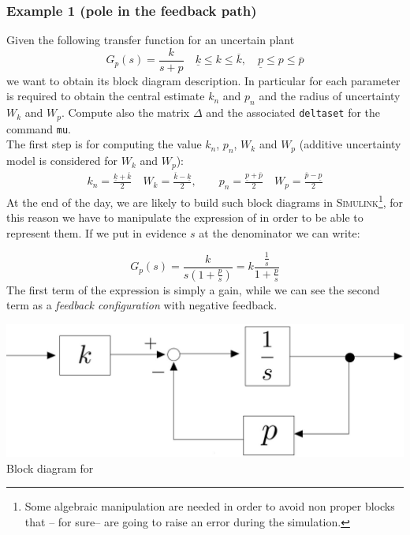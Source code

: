 \documentclass[a4paper, 12pt]{article}
\begin{document}
\subsubsection*{Example 1 (pole in the feedback path)}
Given the following transfer function for an uncertain plant 
\begin{equation}\label{eq:ex1}
    G_p(s)=\frac{k}{s+p} \quad  
    \underline{k}\le {k} \le \overline{k}, \quad
    \underline{p}\le {p} \le \overline{p}
\end{equation}
we want to obtain its block diagram description. In particular for each parameter is required to obtain the central estimate $k_n$ and $p_n$ and the radius of uncertainty $W_k$ and $W_p$. Compute also the matrix $\Delta$ and the associated \texttt{deltaset} for the command \texttt{mu}.\\
The first step is for computing the value $k_n$, $p_n$, $W_k$ and $W_p$ (additive uncertainty model is considered for $W_k$ and $W_p$):
\begin{align}
    k_n=\frac{\underline{k}+\overline{k}}{2} \quad
    W_k=\frac{\overline{k}-\underline{k}}{2}, \qquad 
    p_n=\frac{\underline{p}+\overline{p}}{2} \quad
    W_p=\frac{\overline{p}-\underline{p}}{2}
\end{align}
\noindent
At the end of the day, we are likely to build such block diagrams in \textsc{Simulink}\footnote{
    Some algebraic manipulation are needed in order to avoid non proper blocks that -- for sure-- are going to raise an error during the simulation.
}, for this reason we have to manipulate the expression of  in order to be able to represent them. If we put in evidence $s$ at the denominator we can write:

\begin{multicols}{2}
    {\large{
        \begin{equation*}
            G_p(s)=\frac{k}{s(1+\frac{p}{s})}=k \frac{\frac{1}{s}}{1+\frac{p}{s}}
        \end{equation*}
    }}
    The first term of the expression is simply a gain, while we can see the second term as a \textit{feedback configuration} with negative feedback.
    \newcolumn 
    \begin{center}
        \includegraphics[scale=0.15]{img/ex1.jpg}\\
        \textsf{Block diagram for }
    \end{center}
\end{multicols}
\end{document}
